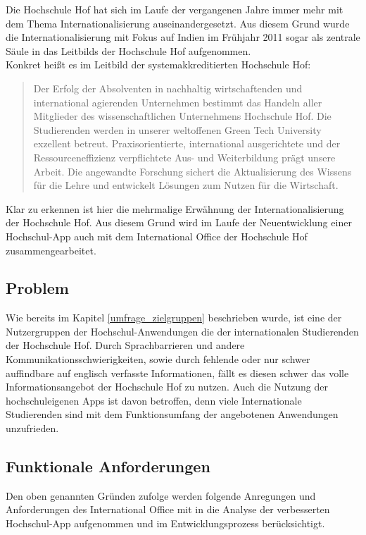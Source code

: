 Die Hochschule Hof hat sich im Laufe der vergangenen Jahre immer mehr mit dem Thema Internationalisierung auseinandergesetzt. Aus diesem Grund wurde die Internationalisierung mit Fokus auf Indien im Frühjahr 2011 sogar als zentrale Säule in das Leitbilds der Hochschule Hof aufgenommen\autocite[Vgl.][]{campuls}.
\\
\linebreak
Konkret heißt es im Leitbild der systemakkreditierten Hochschule Hof\autocite[Vgl.][]{fhhofwebsite}:
\begin{quote}
Der Erfolg der Absolventen in nachhaltig wirtschaftenden und international agierenden Unternehmen bestimmt das Handeln aller Mitglieder des wissenschaftlichen Unternehmens Hochschule Hof. Die Studierenden werden in unserer  weltoffenen Green Tech University exzellent betreut. Praxisorientierte, international ausgerichtete und der Ressourceneffizienz verpflichtete Aus- und Weiterbildung prägt unsere Arbeit. Die angewandte Forschung sichert die Aktualisierung des Wissens für die Lehre und entwickelt Lösungen zum Nutzen für die Wirtschaft.
\end{quote}
Klar zu erkennen ist hier die mehrmalige Erwähnung der Internationalisierung der Hochschule Hof. Aus diesem Grund wird im Laufe der Neuentwicklung einer Hoch\-schul-\ac{App} auch mit dem International Office der Hochschule Hof zusammengearbeitet.

\subsection{Problem}

Wie bereits im Kapitel \ref{umfrage_zielgruppen} beschrieben wurde, ist eine der Nutzergruppen der Hochschul-Anwendungen die der internationalen Studierenden der Hochschule Hof. Durch Sprachbarrieren und andere Kommunikationsschwierigkeiten, sowie durch fehlende oder nur schwer auffindbare auf englisch verfasste Informationen, fällt es diesen schwer das volle Informationsangebot der Hochschule Hof zu nutzen. Auch die Nutzung der hochschuleigenen \acp{App} ist davon betroffen, denn viele Internationale Studierenden sind mit dem Funktionsumfang der angebotenen Anwendungen unzufrieden. 

\subsection{Funktionale Anforderungen\label{sec:anf_io}}

Den oben genannten Gründen zufolge werden folgende Anregungen und Anforderungen des International Office mit in die Analyse der verbesserten Hochschul-\ac{App} aufgenommen und im Entwicklungsprozess berücksichtigt.

